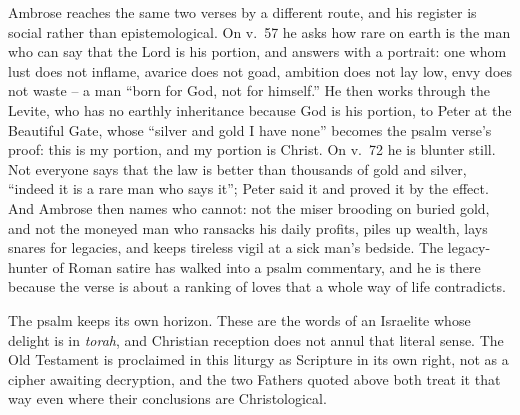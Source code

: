 Ambrose reaches the same two verses by a different route, and his register is social rather than epistemological. On v.~57 he asks how rare on earth is the man who can say that the Lord is his portion, and answers with a portrait: one whom lust does not inflame, avarice does not goad, ambition does not lay low, envy does not waste -- a man ``born for God, not for himself.'' He then works through the Levite, who has no earthly inheritance because God is his portion, to Peter at the Beautiful Gate, whose ``silver and gold I have none'' becomes the psalm verse's proof: this is my portion, and my portion is Christ. On v.~72 he is blunter still. Not everyone says that the law is better than thousands of gold and silver, ``indeed it is a rare man who says it''; Peter said it and proved it by the effect. And Ambrose then names who cannot: not the miser brooding on buried gold, and not the moneyed man who ransacks his daily profits, piles up wealth, lays snares for legacies, and keeps tireless vigil at a sick man's bedside. The legacy-hunter of Roman satire has walked into a psalm commentary, and he is there because the verse is about a ranking of loves that a whole way of life contradicts.

The psalm keeps its own horizon. These are the words of an Israelite whose delight is in \emph{torah}, and Christian reception does not annul that literal sense. The Old Testament is proclaimed in this liturgy as Scripture in its own right, not as a cipher awaiting decryption, and the two Fathers quoted above both treat it that way even where their conclusions are Christological.
